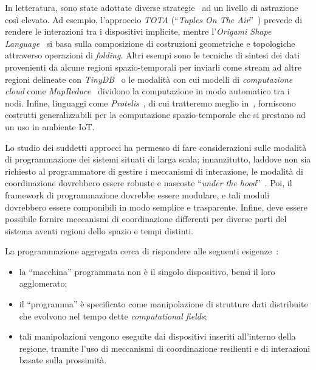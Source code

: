 In letteratura, sono state adottate diverse strategie~\cite{7274429} ad un livello di astrazione così elevato.
Ad esempio, l'approccio \emph{TOTA} (``\emph{Tuples On The Air}''~\cite{10.1145/1538942.1538945}) prevede di rendere le interazioni tra i dispositivi implicite,
mentre l'\emph{Origami Shape Language}~\cite{nagpal2001programmable} si basa sulla composizione di costruzioni geometriche e topologiche attraverso operazioni di \emph{folding}.
Altri esempi sono le tecniche di sintesi dei dati provenienti da alcune regioni spazio-temporali per inviarli come stream ad altre regioni delineate con \emph{TinyDB}~\cite{1017485}
o le modalità con cui modelli di \emph{computazione cloud} come \emph{MapReduce}~\cite{10.1145/1327452.1327492} dividono la computazione in modo automatico tra i nodi.
Infine, linguaggi come \emph{Protelis}~\cite{PianiniSASOTutorial2017}, di cui tratteremo meglio in~, forniscono costrutti generalizzabili per la computazione spazio-temporale che si prestano ad un uso in ambiente IoT.

Lo studio dei suddetti approcci ha permesso di fare considerazioni sulle modalità di programmazione dei sistemi situati di larga scala;
innanzitutto, laddove non sia richiesto al programmatore di gestire i meccanismi di interazione, le modalità di coordinazione dovrebbero essere robuste e nascoste ``\emph{under the hood}''~\cite{7274429}.
Poi, il framework di programmazione dovrebbe essere modulare, e tali moduli dovrebbero essere componibili in modo semplice e trasparente.
Infine, deve essere possibile fornire meccanismi di coordinazione differenti per diverse parti del sistema aventi regioni dello spazio e tempi distinti.

La programmazione aggregata cerca di rispondere alle seguenti esigenze~\cite{7274429}:

\begin{itemize}
  \item la ``macchina'' programmata non è il singolo dispositivo, bensì il loro agglomerato; %
  \item il ``programma'' è specificato come manipolazione di strutture dati distribuite che evolvono nel tempo dette \emph{computational fields};
  \item tali manipolazioni vengono eseguite dai dispositivi inseriti all'interno della regione, tramite l'uso di meccanismi di coordinazione resilienti e di interazioni basate sulla prossimità.
\end{itemize}

